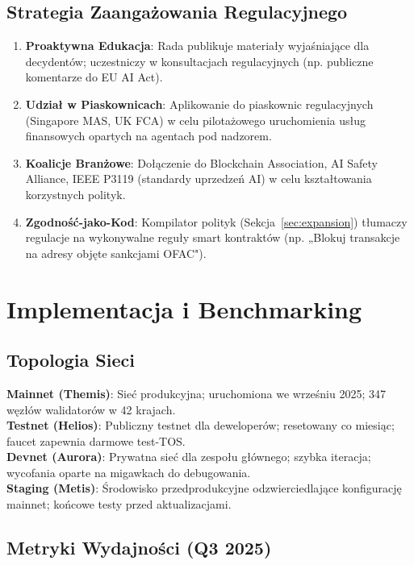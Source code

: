 \documentclass[11pt]{article}
\begin{document}
\subsection{Strategia Zaangażowania Regulacyjnego}

\begin{enumerate}[noitemsep]
  \item \textbf{Proaktywna Edukacja}: Rada publikuje materiały wyjaśniające dla decydentów; uczestniczy w konsultacjach regulacyjnych (np. publiczne komentarze do EU AI Act).
  \item \textbf{Udział w Piaskownicach}: Aplikowanie do piaskownic regulacyjnych (Singapore MAS, UK FCA) w celu pilotażowego uruchomienia usług finansowych opartych na agentach pod nadzorem.
  \item \textbf{Koalicje Branżowe}: Dołączenie do Blockchain Association, AI Safety Alliance, IEEE P3119 (standardy uprzedzeń AI) w celu kształtowania korzystnych polityk.
  \item \textbf{Zgodność-jako-Kod}: Kompilator polityk (Sekcja~\ref{sec:expansion}) tłumaczy regulacje na wykonywalne reguły smart kontraktów (np. „Blokuj transakcje na adresy objęte sankcjami OFAC").
\end{enumerate}

\section{Implementacja i Benchmarking}
\label{sec:implementation}

\subsection{Topologia Sieci}

\textbf{Mainnet (Themis)}: Sieć produkcyjna; uruchomiona we wrześniu 2025; 347 węzłów walidatorów w 42 krajach.\\
\textbf{Testnet (Helios)}: Publiczny testnet dla deweloperów; resetowany co miesiąc; faucet zapewnia darmowe test-TOS.\\
\textbf{Devnet (Aurora)}: Prywatna sieć dla zespołu głównego; szybka iteracja; wycofania oparte na migawkach do debugowania.\\
\textbf{Staging (Metis)}: Środowisko przedprodukcyjne odzwierciedlające konfigurację mainnet; końcowe testy przed aktualizacjami.

\subsection{Metryki Wydajności (Q3 2025)}
\end{document}
